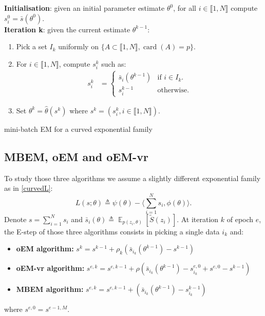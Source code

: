 \documentclass[11pt]{article}
\theoremstyle{plain}
\newcommand{\inter}{\llbracket1,N\rrbracket}
\DeclareMathOperator*{\E}{\mathbb{E}}
\theoremstyle{plain}
\theoremstyle{definition}
\begin{document}
\begin{algorithm}[H]
\textbf{Initialisation}: given an initial parameter estimate $\theta^0$, for all $i \in \inter$ compute $s^0_i = \bar{s}(\theta^0)$.\\
\textbf{Iteration k}: given the current estimate $\theta^{k-1}$:
\begin{enumerate}
\item Pick a set $I_k$ uniformly on $\{A \subset \inter, \operatorname{card}(A)=p\}$.
\item For $i \in \inter$, compute $s^k_{i}$ such as:
\begin{align}
 s^k_i &=
  \begin{cases}
   \bar{s}_i(\theta^{k-1})    & \text{if } i \in I_k.\\
   s^{k-1}_i                               & \text{otherwise}.
  \end{cases}
\end{align}

\item Set $\theta^{k} = \hat{\theta}(s^k)$ where $s^k = (s^k_i, i \in \inter)$.

\end{enumerate}
\caption{mini-batch EM for a curved exponential family}
\label{alg:mbem-expo}
\end{algorithm}

\subsection{MBEM, oEM and oEM-vr}
To study those three algorithms we assume a slightly different exponential family as in \eqref{curvedL}:
\begin{equation}\label{curvedL}
L(s;\theta) \triangleq \psi(\theta) - \langle \sum_{i=1}^N{s_i}, \phi(\theta)\rangle.
\end{equation}
Denote $s = \sum_{i=1}^N{s_i}$ and $\bar{s}_i(\theta) \triangleq \E_{p(z_i, \theta)}[\tilde{S}(z_i)]$. At iteration $k$ of epoch $e$, the E-step of those three algorithms consists in picking a single data $i_k$ and:
\begin{itemize}
\item \textbf{oEM algorithm:}  $s^{k} = s^{k-1} + \rho_k ( \bar{s}_{i_k}(\theta^{k-1})  - s^{k-1} )$
\item \textbf{oEM-vr algorithm: }  $s^{e,k} = s^{e,k-1} + \rho ( \bar{s}_{i_k}(\theta^{k-1}) - s_{i_k}^{e,0}+ s^{e,0} - s^{k-1} )$
\item \textbf{MBEM algorithm: }  $s^{e,k} = s^{e,k-1} +  ( \bar{s}_{i_k}(\theta^{k-1})  - s_{i_k}^{k-1} )$
\end{itemize}
where $ s^{e,0}  = s^{e-1,M}$.
\end{document}
